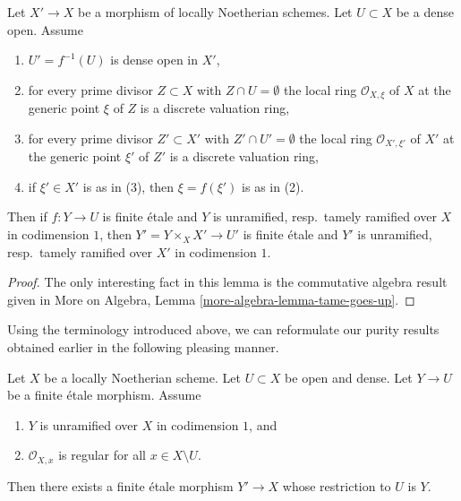 \begin{lemma}
\label{lemma-pullback-tame-codim1}
Let $X' \to X$ be a morphism of locally Noetherian schemes.
Let $U \subset X$ be a dense open. Assume
\begin{enumerate}
\item $U' = f^{-1}(U)$ is dense open in $X'$,
\item for every prime divisor $Z \subset X$ with $Z \cap U = \emptyset$
the local ring $\mathcal{O}_{X, \xi}$ of $X$ at the generic point $\xi$
of $Z$ is a discrete valuation ring,
\item for every prime divisor $Z' \subset X'$
with $Z' \cap U' = \emptyset$ the local ring $\mathcal{O}_{X', \xi'}$
of $X'$ at the generic point $\xi'$ of $Z'$ is a discrete valuation ring,
\item if $\xi' \in X'$ is as in (3), then $\xi = f(\xi')$ is as in (2).
\end{enumerate}
Then if $f : Y \to U$ is finite \'etale and
$Y$ is unramified, resp.\ tamely ramified over $X$
in codimension $1$, then $Y' = Y \times_X X' \to U'$ is finite \'etale
and $Y'$ is unramified, resp.\ tamely ramified over $X'$ in codimension $1$.
\end{lemma}

\begin{proof}
The only interesting fact in this lemma is the commutative algebra
result given in More on Algebra, Lemma \ref{more-algebra-lemma-tame-goes-up}.
\end{proof}

\noindent
Using the terminology introduced above, we can reformulate our
purity results obtained earlier in the following pleasing manner.

\begin{lemma}
\label{lemma-purity-one-divisor-general}
Let $X$ be a locally Noetherian scheme. Let $U \subset X$ be open and dense.
Let $Y \to U$ be a finite \'etale morphism. Assume
\begin{enumerate}
\item $Y$ is unramified over $X$ in codimension $1$, and
\item $\mathcal{O}_{X, x}$ is regular for all $x \in X \setminus U$.
\end{enumerate}
Then there exists a finite \'etale morphism $Y' \to X$
whose restriction to $U$ is $Y$.
\end{lemma}

